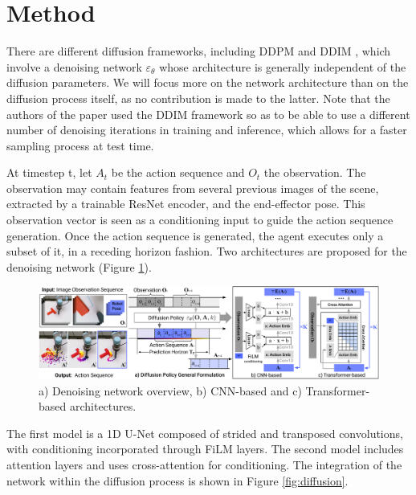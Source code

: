 \section{Method}
\label{sec:method}


There are different diffusion frameworks, including DDPM \cite{ho_denoising_2020} and
DDIM \cite{song_denoising_2022}, which involve a denoising network $\varepsilon_\theta$ whose
architecture is generally independent of the diffusion parameters. We will focus more on the network
architecture than on the diffusion process itself, as no contribution is made to the latter. Note that
the authors of the paper used the DDIM framework so as to be able to use a different number of denoising
iterations in training and inference, which allows for a faster sampling process at test time.

At timestep t, let $A_t$ be the action sequence and $O_t$ the observation.
The observation may contain features from several previous images of the scene, extracted by a trainable
ResNet encoder, and the end-effector pose. This observation vector is seen as a conditioning input
to guide the action sequence generation. Once the action sequence is generated, the agent executes only a
subset of it, in a receding horizon fashion.
Two architectures are proposed for the denoising network (Figure \ref{fig:diffusion_policy}).
\begin{figure}
    \centering
    \includegraphics[width=\linewidth]{figures/policy_input_output.pdf}
    \caption{a) Denoising network overview, b) CNN-based and c) Transformer-based architectures.}
    \label{fig:diffusion_policy}
\end{figure}
The first model is a 1D U-Net composed of strided and transposed convolutions, with conditioning
incorporated through FiLM layers. The second model includes attention layers and uses cross-attention
for conditioning.
The integration of the network within the diffusion process is shown in Figure \ref{fig:diffusion}.

